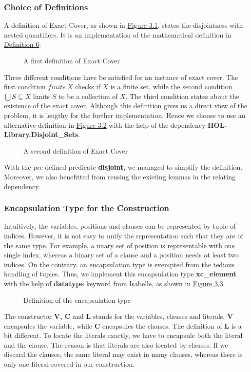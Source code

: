 \subsubsection{Choice of Definitions}
A definition of Exact Cover, as shown in \hyperref[figure:3]{Figure 3.1}, states the disjointness with nested quantifiers.
It is an implementation of the mathematical definition in \hyperref[eq:1]{Definition 6}.
\begin{figure}[h!]
    \caption{A first definition of Exact Cover}
    \label{figure:3}
\end{figure}
Three different conditions have be satisfied for an instance of exact cover.
The first condition $finite\ X$ checks if $X$ is a finite set, while the second 
condition $\bigcup S \subseteq X$ limits $S$ to be a collection of $X$. The third 
condition states about the existence of the exact cover. Although this definition gives us a direct 
view of the problem, it is lengthy for the further implementation. Hence we choose to use 
an alternative definition in \hyperref[figure:4]{Figure 3.2} with the help of the dependency \textbf{HOL-Library.Disjoint\_Sets}.
\begin{figure}[h!]
    \caption{A second definition of Exact Cover}
    \label{figure:4}
\end{figure}
With the pre-defined predicate \textbf{disjoint}, we managed to simplify the definition. Moreover, 
we also benefitted from reusing the existing lemmas in the relating dependency.

\subsubsection{Encapsulation Type for the Construction}
Intuitively, the variables, positions and clauses can be represented by tuple of indices. However, it is not easy 
to unify the representation such that they are of the same type. For example, a unary set of position is representable with
one single index, whereas a binary set of a clause and a position needs at least two indices. 
On the contrary, an encapsulation type is exempted from the tedious handling of tuples.
Thus, we implement this encapsulation type \textbf{xc\_element} with the help of \textbf{datatype} keyword from Isabelle, 
as shown in \hyperref[figure:5]{Figure 3.3}
\begin{figure}[h!]
    \caption{Definition of the encapsulation type}
    \label{figure:5}
\end{figure}
The constructor \textbf{V, C} and \textbf{L} stands for the variables, clauses and literals. \textbf{V} 
encapsules the variable, while \textbf{C} encapsules the clauses. The definition of \textbf{L} is a bit different.
To locate the literals exactly, we have to encapsule both the literal and the clause. The reason is that literals are 
also located by clauses. If we discard the clauses, the same literal may exist in many clauses, 
whereas there is only one literal covered in our construction.


